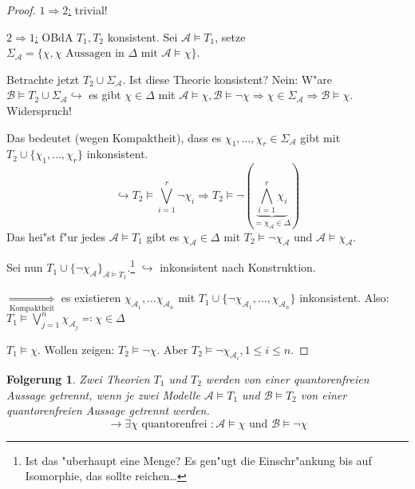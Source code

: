 \documentclass[a4paper,12pt,numbers=noenddot,parskip=full]{scrartcl}
\newcommand{\scrA}{\mathcal{A}}
\newcommand{\scrB}{\mathcal{B}}
\theoremstyle{dotless}
\newtheorem{corollary}[theorem]{Folgerung}
\begin{document}
\begin{proof}
	\underline{$1\Rightarrow2$:} trivial!
	
	\underline{$2 \Rightarrow 1$:} OBdA $T_1, T_2$ konsistent. Sei $\scrA \models T_1$, setze ${\Sigma_\scrA =\{\chi, \chi \text{ Aussagen in } \Delta\text{ mit } \scrA \models \chi \}}$. 
	
	Betrachte jetzt $T_2 \cup \Sigma_\scrA$. Ist diese Theorie konsistent? Nein: W"are $\scrB \models T_2 \cup \Sigma_\scrA \hookrightarrow$ es gibt $\chi \in \Delta$ mit $\scrA \models \chi, \scrB \models \lnot \chi \Rightarrow \chi \in \Sigma_\scrA \Rightarrow \scrB \models \chi$. Widerspruch!
	
	Das bedeutet (wegen Kompaktheit), dass es $\chi_1, \dots, \chi_r \in \Sigma_\scrA$ gibt mit $T_2 \cup \{\chi_1, \dots, \chi_r\}$ inkonsistent.
	\begin{equation*}
		\hookrightarrow T_2 \models \bigvee\limits_{i=1}^{r} \lnot \chi_i \Rightarrow T_2 \models \lnot (\underbrace{\bigwedge\limits_{i=1}^{r} \chi_i}_{=\chi_\scrA \in \Delta })
	\end{equation*}
	Das hei"st f"ur jedes $\scrA \models T_1$ gibt es $\chi_\scrA \in \Delta$ mit $T_2 \models \lnot \chi_\scrA$ und $\scrA \models \chi_\scrA$.
	
	Sei nun $T_1 \cup \{\lnot \chi_\scrA \}_{\scrA \models T_1}$.\footnote{Ist das "uberhaupt eine Menge? Es gen"ugt die Einschr"ankung bis auf Isomorphie, das sollte reichen\dots} $\hookrightarrow$ inkonsistent nach Konstruktion.
	
	$\underset{\text{Kompaktheit}}{\Rightarrow}$ es existieren $\chi_{\scrA_1}, \dots \chi_{\scrA_n}$ mit $T_1 \cup \{\lnot \chi_{\scrA_1}, \dots, \chi_{\scrA_n} \}$ inkonsistent. Also:\\ 
	$T_1 \models \bigvee\limits_{j=1}^n \chi_{\scrA_j} \eqqcolon \chi \in \Delta$
	
	$T_1 \models \chi$. Wollen zeigen: $T_2 \models \lnot \chi$. Aber $T_2 \models \lnot \chi_{\scrA_i}, 1 \leq i \leq n$.
\end{proof}

\begin{corollary}
	Zwei Theorien $T_1$ und $T_2$ werden von einer quantorenfreien Aussage getrennt, wenn je zwei Modelle $\scrA \models T_1$ und $\scrB \models T_2$ von einer quantorenfreien Aussage getrennt werden.
	\begin{equation*}
		\rightarrow \exists\chi \text{ quantorenfrei }: \scrA \models \chi \text{ und } \scrB \models \lnot \chi
	\end{equation*}
\end{corollary}
\end{document}
